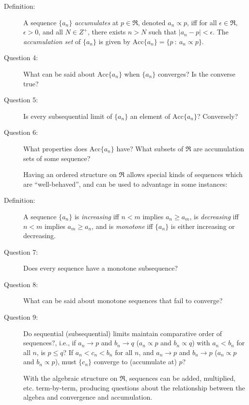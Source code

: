 \documentclass{article}
\begin{document}
\begin{description}
  \item[Definition:] A sequence $\{ a_n \}$ \emph{accumulates} at $p \in \Re$, denoted $a_n \propto p$, iff for all $\epsilon \in \Re$, $\epsilon > 0$, and all $N \in Z^+$, there exists $n > N$ such that $|a_n - p| < \epsilon$. The \emph{accumulation set} of $\{ a_n \}$ is given by $\text{Acc} \{ a_n \} = \{ p\ :\ a_n \propto p \}$.

  \item[Question 4:] What can be said about $\text{Acc} \{ a_n \}$ when $\{ a_n \}$ converges? Is the converse true?

  \item[Question 5:] Is every subsequential limit of $\{ a_n \}$ an element of $\text{Acc} \{ a_n \}$? Conversely?

  \item[Question 6:] What properties does $\text{Acc} \{ a_n \}$ have? What subsets of $\Re$ are accumulation sets of some sequence?

  \item[] Having an ordered structure on $\Re$ allows special kinds of sequences which are ``well-behaved'', and can be used to advantage in some instances:

  \item[Definition:] A sequence $\{ a_n \}$  is \emph{increasing} iff $n < m$ implies $a_n \geq a_m$, is \emph{decreasing} iff $n < m$ implies $a_m \geq a_n$, and is \emph{monotone} iff $\{ a_n \}$ is either increasing or decreasing.

  \item[Question 7:] Does every sequence have a monotone subsequence?

  \item[Question 8:] What can be said about monotone sequences that fail to converge?

  \item[Question 9:] Do sequential (subsequential) limits maintain comparative order of sequences?, i.e., if $a_n \to p$ and $b_n \to q$ ($a_n \propto p$ and $b_n \propto q$) with $a_n < b_n$ for all $n$, is $p \leq q$? If $a_n < c_n < b_n$ for all $n$, and $a_n \to p$ and $b_n \to p$ ($a_n \propto p$ and $b_n \propto p$), must $\{ c_n \}$ converge to (accumulate at) $p$?

  \item[] With the algebraic structure on $\Re$, sequences can be added, multiplied, etc. term-by-term, producing questions about the relationship between the algebra and convergence and accumulation.


\end{description}
\end{document}
